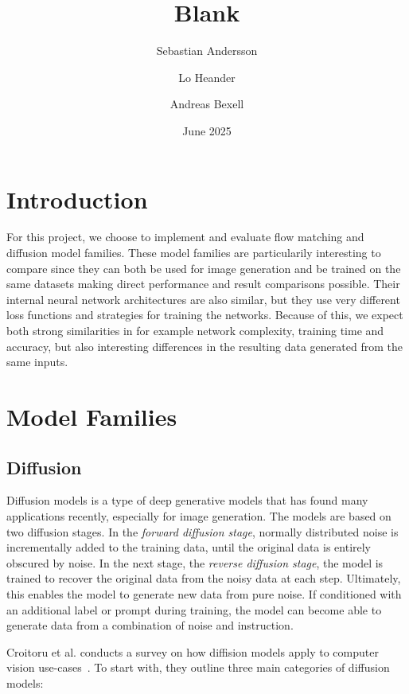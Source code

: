 \documentclass{article}
\title{Blank}
\author{Sebastian Andersson \and Lo Heander \and Andreas Bexell}
\date{June 2025}
\begin{document}
\maketitle

\section{Introduction}

For this project, we choose to implement and evaluate flow matching and diffusion model families. These model families are particularily interesting to compare since they can both be used for image generation and be trained on the same datasets making direct performance and result comparisons possible. Their internal neural network architectures are also similar, but they use very different loss functions and strategies for training the networks. Because of this, we expect both strong similarities in for example network complexity, training time and accuracy, but also interesting differences in the resulting data generated from the same inputs.

\section{Model Families}

\subsection{Diffusion}

Diffusion models is a type of deep generative models that has found many applications recently, especially for image generation. The models are based on two diffusion stages. In the \emph{forward diffusion stage}, normally distributed noise is incrementally added to the training data, until the original data is entirely obscured by noise. In the next stage, the \emph{reverse diffusion stage}, the model is trained to recover the original data from the noisy data at each step. Ultimately, this enables the model to generate new data from pure noise. If conditioned with an additional label or prompt during training, the model can become able to generate data from a combination of noise and instruction. \cite{croitoru2023diffusion,yang2023diffusion}

Croitoru et al. conducts a survey on how diffision models apply to computer vision use-cases~\cite{croitoru2023diffusion}. To start with, they outline three main categories of diffusion models:
\end{document}

